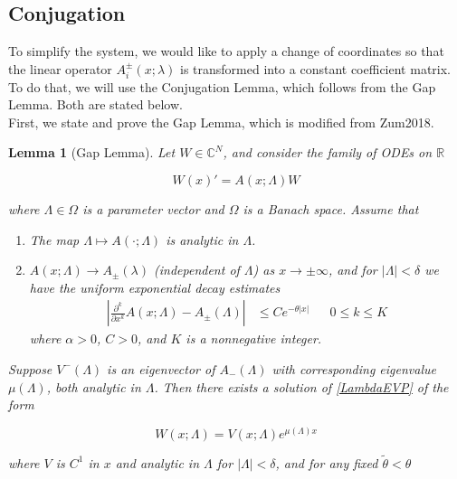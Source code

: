 \documentclass[12pt]{article}
\def\R{{\mathbb R}}
\def\C{{\mathbb C}}
\newtheorem{lemma}{Lemma}
\begin{document}
\subsection{Conjugation}

To simplify the system, we would like to apply a change of coordinates so that the linear operator $A_i^\pm(x; \lambda)$ is transformed into a constant coefficient matrix. To do that, we will use the Conjugation Lemma, which follows from the Gap Lemma. Both are stated below.\\

First, we state and prove the Gap Lemma, which is modified from Zum2018. 

\begin{lemma}[Gap Lemma]\label{gaplemma}
Let $W \in \C^N$, and consider the family of ODEs on $\R$

\begin{equation}\label{LambdaEVP}
W(x)' = A(x; \Lambda) W
\end{equation}

where $\Lambda \in \Omega$ is a parameter vector and $\Omega$ is a Banach space. Assume that

\begin{enumerate}
	\item The map $\Lambda \mapsto A(\cdot; \Lambda)$ is analytic in $\Lambda$.
	\item $A(x; \Lambda) \rightarrow A_\pm(\lambda)$ (independent of $\Lambda$) as $x \rightarrow \pm \infty$, and for $|\Lambda| < \delta$ we have the uniform exponential decay estimates 
	\begin{align}
	\left| \frac{\partial^k}{\partial x^k} A(x; \Lambda) - A_\pm(\Lambda) \right| 
	&\leq C e^{-\theta |x|} && 0 \leq k \leq K
	\end{align}
	where $\alpha > 0$, $C > 0$, and $K$ is a nonnegative integer.
\end{enumerate}

Suppose $V^-(\Lambda)$ is an eigenvector of $A_-(\Lambda)$ with corresponding eigenvalue $\mu(\Lambda)$, both analytic in $\Lambda$. Then there exists a solution of \ref{LambdaEVP} of the form 

\begin{equation}
W(x; \Lambda) = V(x; \Lambda) e^{\mu(\Lambda)x}
\end{equation}

where $V$ is $C^1$ in $x$ and analytic in $\Lambda$ for $|\Lambda| < \delta$, and for any fixed $\tilde{\theta} < \theta$


\end{lemma}
\end{document}
